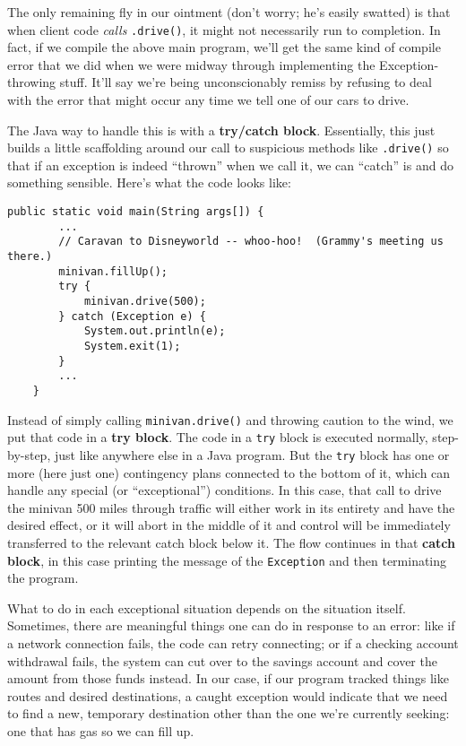 The only remaining fly in our ointment (don't worry; he's easily swatted) is
that when client code \textit{calls} \texttt{.drive()}, it might not
necessarily run to completion. In fact, if we compile the above main program,
we'll get the same kind of compile error that we did when we were midway
through implementing the Exception-throwing stuff. It'll say we're being
unconscionably remiss by refusing to deal with the error that might occur
any time we tell one of our cars to drive.

The Java way to handle this is with a \textbf{try/catch block}. Essentially,
this just builds a little scaffolding around our call to suspicious methods
like \texttt{.drive()} so that if an exception is indeed ``thrown'' when we
call it, we can ``catch'' is and do something sensible. Here's what the code
looks like:

\begin{Verbatim}[samepage=true,fontsize=\footnotesize,frame=single]
    public static void main(String args[]) {
        ...
        // Caravan to Disneyworld -- whoo-hoo!  (Grammy's meeting us there.)
        minivan.fillUp();
        try {
            minivan.drive(500);
        } catch (Exception e) {
            System.out.println(e);
            System.exit(1);
        }
        ...
    }
\end{Verbatim}

Instead of simply calling \texttt{minivan.drive()} and throwing caution to the
wind, we put that code in a \textbf{try block}. The code in a \texttt{try}
block is executed normally, step-by-step, just like anywhere else in a Java
program. But the \texttt{try} block has one or more (here just one)
contingency plans connected to the bottom of it, which can handle any special
(or ``exceptional'') conditions. In this case, that call to drive the minivan
500 miles through traffic will either work in its entirety and have the
desired effect, or it will abort in the middle of it and control will be
immediately transferred to the relevant catch block below it. The flow
continues in that \textbf{catch block}, in this case printing the message of
the \texttt{Exception} and then terminating the program.

What to do in each exceptional situation depends on the situation itself.
Sometimes, there are meaningful things one can do in response to an error:
like if a network connection fails, the code can retry connecting; or if a
checking account withdrawal fails, the system can cut over to the savings
account and cover the amount from those funds instead. In our case, if our
program tracked things like routes and desired destinations, a caught
exception would indicate that we need to find a new, temporary destination
other than the one we're currently seeking: one that has gas so we can fill
up.


